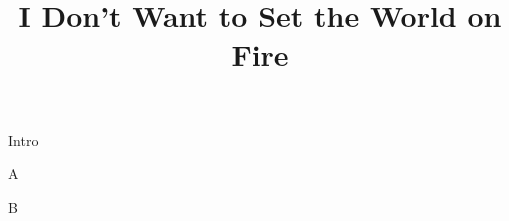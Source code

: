 \documentclass[timestamp]{jazzgrid}
\title{\textbf{I Don't Want to Set the World on Fire}}
\begin{document}
\maketitle
\begin{musicsection}{Intro}
	{\barfour{}
		{}
		{}
		{}
		{}
	}
	{\barfour{}
		{}
		{}
		{}
		{}
	}
\end{musicsection}

\begin{musicsection}{A}
\barline
	{\barfour{}
		{}
		{}
		{}
		{}
	}
	{\barfour{}
		{}
		{}
		{}
		{}
	}
	{\barfour{}
		{}
		{}
		{}
		{}
	}
	{\barfour{}
		{}
		{}
		{}
		{}
	}
\barline
	{\barfour{}
		{}
		{}
		{}
		{}
	}
	{\barfour{}
		{}
		{}
		{}
		{}
	}
	{
		{}
		{}
		{}
		{}
	}
	{\barfour{}
		{}
		{}
		{}
		{}
	}
	{
		{}
		{}
		{}
		{}
	}
	{\barfour{}
		{}
		{}
		{}
		{}
	}
	{
		{}
		{}
		{}
		{}
	}
	{\barfour{}
		{}
		{}
		{}
		{}
	}
\end{musicsection}


\begin{musicsection}{B}
\barline
	{\barfour{}
		{}
		{}
		{}
		{}
	}
	{\barfour{}
		{}
		{}
		{}
		{}
	}
	{\barfour{}
		{}
		{}
		{}
		{}
	}
	{\barfour{}
		{}
		{}
		{}
		{}
	}
\barline
	{\barfour{}
		{}
		{}
		{}
		{}
	}
	{\barfour{}
		{}
		{}
		{}
		{}
	}
	{\barfour{}
		{}
		{}
		{}
		{}
	}
	{\barfour{}
		{}
		{}
		{}
		{}
	}
\end{musicsection}
\end{document}
